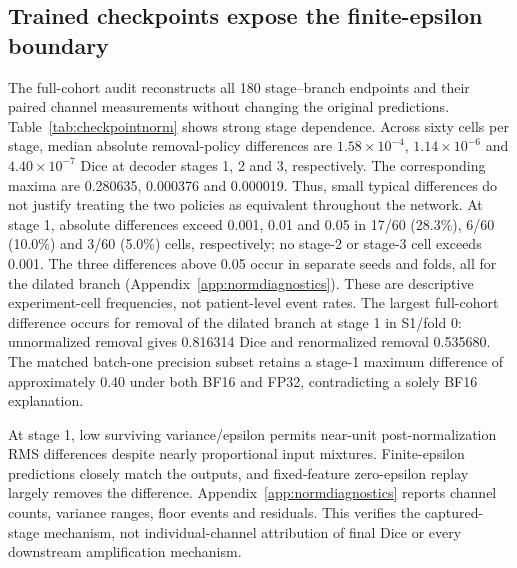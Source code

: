 \documentclass[mathematics,article,submit,pdftex,moreauthors]{Definitions/mdpi}
\begin{document}
\subsection{Trained checkpoints expose the finite-epsilon boundary}\label{subsec:normresults}
The full-cohort audit reconstructs all 180 stage--branch endpoints and their
paired channel measurements without changing the original predictions.
Table~\ref{tab:checkpointnorm} shows strong stage dependence. Across sixty
cells per stage, median absolute removal-policy differences are
$1.58\times10^{-4}$, $1.14\times10^{-6}$ and $4.40\times10^{-7}$ Dice
at decoder stages 1, 2 and 3, respectively. The corresponding maxima are
0.280635, 0.000376 and 0.000019. Thus, small typical differences do not
justify treating the two policies as equivalent throughout the network.
At stage 1, absolute differences exceed 0.001, 0.01 and 0.05 in
17/60 (28.3\%), 6/60 (10.0\%) and 3/60 (5.0\%) cells, respectively;
no stage-2 or stage-3 cell exceeds 0.001. The three differences above 0.05
occur in separate seeds and folds, all for the dilated branch
(Appendix~\ref{app:normdiagnostics}). These are descriptive experiment-cell
frequencies, not patient-level event rates.
The largest full-cohort difference occurs for removal of the dilated branch
at stage 1 in S1/fold 0: unnormalized removal gives 0.816314 Dice and
renormalized removal 0.535680. The matched batch-one precision subset
retains a stage-1 maximum difference of approximately 0.40 under both
BF16 and FP32, contradicting a solely BF16 explanation.

\begin{table}[H]
\caption{Direct checkpoint comparison of removal policies on fifteen banks.
$\Delta$ is renormalized-removal minus unnormalized-removal
positive-reference region-macro Dice; each entry summarizes sixty
seed--fold--branch cells at one stage. Primary results use the full cohort
and original batch-four BF16 runtime. Subset columns use the same ten
patients/eleven studies in batch-one BF16 and FP32, not a full-cohort FP32 test.
The lower panel reports full-cohort strict exceedances, $n/60$ (percentage),
at three retrospectively chosen descriptive thresholds.}
\label{tab:checkpointnorm}
\centering\small\setlength{\tabcolsep}{3pt}

\par\medskip

\end{table}

At stage 1, low surviving variance/epsilon permits near-unit post-normalization
RMS differences despite nearly proportional input mixtures. Finite-epsilon
predictions closely match the outputs, and fixed-feature zero-epsilon replay
largely removes the difference. Appendix~\ref{app:normdiagnostics} reports
channel counts, variance ranges, floor events and residuals. This verifies
the captured-stage mechanism, not individual-channel attribution of final
Dice or every downstream amplification mechanism.
\end{document}
